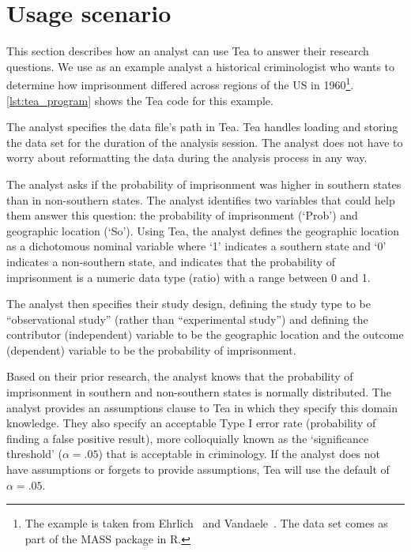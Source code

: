 \section{Usage scenario}\label{usageScenarioTea}
\figureTeaProgram

This section describes how an analyst can use Tea to answer their research
questions. We use as an example analyst a historical criminologist who wants to
determine how imprisonment differed across regions of the US in
1960\footnote{The example is taken from Ehrlich~\cite{ehrlich1973participation}
and Vandaele~\cite{vandaele1987participation}. The data set comes as part of the
MASS package in R.}. \autoref{lst:tea_program} shows the Tea code for this
example.

The analyst specifies the data file's path in Tea. Tea handles loading and
storing the data set for the duration of the analysis session. The analyst does
not have to worry about reformatting the data during the analysis process in any way.

The analyst asks if the probability of imprisonment was higher in
southern states than in non-southern states. The analyst identifies
two variables that could help them answer this question: the
probability of imprisonment (`Prob') and geographic location
(`So'). %
Using Tea, the analyst defines the geographic
location as a dichotomous nominal variable where `1' indicates a
southern state and `0' indicates a non-southern state, and indicates that the
probability of imprisonment is a numeric data type (ratio) with a
range between 0 and 1. %

The analyst then specifies their study design, defining the study type
to be ``observational study'' (rather than ``experimental study'') and
defining the contributor (independent) variable to be the geographic location and
the outcome (dependent) variable to be the probability of
imprisonment.

Based on their prior research, the analyst knows that the probability
of imprisonment in southern and non-southern states is normally
distributed. The analyst provides an assumptions clause to Tea in
which they specify this domain knowledge. They also specify an
acceptable Type I error rate (probability of finding a false positive
result), more colloquially known as the `significance threshold'
($\alpha = .05$) that is acceptable in criminology. If the analyst
does not have assumptions or forgets to provide assumptions, Tea will
use the default of $\alpha = .05$.

